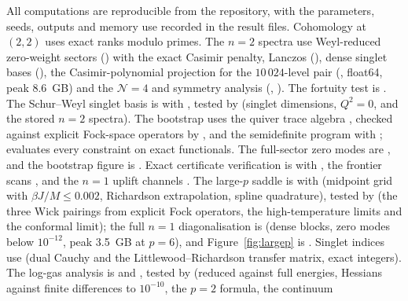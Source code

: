\documentclass[10pt]{article}
\begin{document}
All computations are reproducible from the repository, with the parameters, seeds, outputs and memory use recorded
in the result files. Cohomology at $(2,2)$ uses exact ranks modulo primes. The $n=2$ spectra use Weyl-reduced
zero-weight sectors () with the exact Casimir penalty, Lanczos (),
dense singlet bases (), the Casimir-polynomial projection for the
$10\,024$-level pair (, float64, peak 8.6~GB) and the
$\mathcal N=4$ and symmetry analysis (, ).
The fortuity test is . The Schur--Weyl singlet basis is
 with , tested by
 (singlet dimensions, $Q^2=0$, and the stored $n=2$ spectra). The bootstrap
uses the quiver trace algebra , checked against explicit Fock-space operators by
, and the semidefinite program  with
;  evaluates every constraint on exact
functionals. The full-sector zero modes are , and the bootstrap figure is
. Exact certificate verification is  with
, the frontier scans , and the
$n=1$ uplift channels . The large-$p$ saddle is  with
 (midpoint grid with $\beta J/M\le0.002$, Richardson extrapolation, spline quadrature),
tested by  (the three Wick pairings from explicit Fock operators, the high-temperature
limits and the conformal limit); the full $n=1$ diagonalisation is  (dense
blocks, zero modes below $10^{-12}$, peak 3.5~GB at $p=6$), and Figure~\ref{fig:largep} is
. Singlet indices use 
(dual Cauchy and the Littlewood--Richardson transfer matrix, exact integers). The log-gas analysis is
 and , tested by 
(reduced against full energies, Hessians against finite differences to $10^{-10}$, the $p=2$ formula, the continuum
\end{document}
